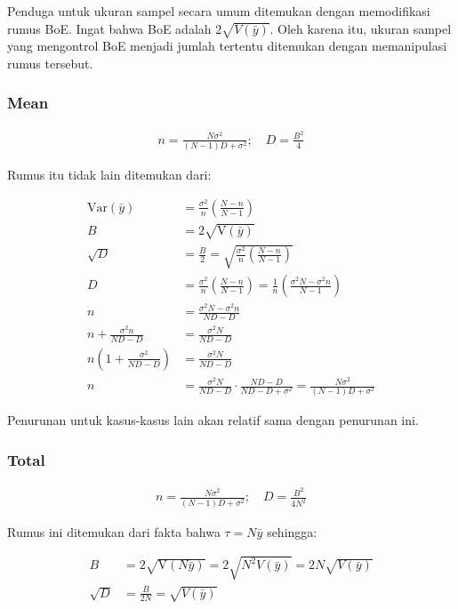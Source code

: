 \documentclass[
  letterpaper,
  DIV=11,
  numbers=noendperiod]{scrreprt}
\begin{document}
Penduga untuk ukuran sampel secara umum ditemukan dengan memodifikasi
rumus BoE. Ingat bahwa BoE adalah \(2\sqrt{V(\bar{y})}\). Oleh karena
itu, ukuran sampel yang mengontrol BoE menjadi jumlah tertentu ditemukan
dengan memanipulasi rumus tersebut.

\hypertarget{mean-2}{%
\subsubsection{Mean}\label{mean-2}}

\[
\begin{aligned}
n=\frac{N\sigma^2}{(N-1)D+\sigma^2}; \quad D=\frac{B^2}{4}
\end{aligned}
\]

Rumus itu tidak lain ditemukan dari:

\[
\begin{aligned}
\mathrm{Var}(\bar{y})&= \frac{\sigma^2}{n} \left( \frac{N-n}{N-1} \right)\\ 
B&=2\sqrt{\mathrm{V}(\bar{y})}\\ 
\sqrt{D}&=\frac{B}{2}=\sqrt{\frac{\sigma^2}{n} \left( \frac{N-n}{N-1} \right)}\\ 
D&=\frac{\sigma^2}{n} \left( \frac{N-n}{N-1} \right)=\frac{1}{n}\left(\frac{\sigma^2N-\sigma^2n}{N-1}\right)\\ 
n&=\frac{\sigma^2N-\sigma^2n}{ND-D}\\ 
n+\frac{\sigma^2n}{ND-D}&=\frac{\sigma^2N}{ND-D}\\ 
n\left(1+\frac{\sigma^2}{ND-D}\right)&=\frac{\sigma^2N}{ND-D}\\ 
n&=\frac{\sigma^2N}{ND-D}\cdot\frac{ND-D}{ND-D+\sigma^2}=\frac{N\sigma^2}{(N-1)D+\sigma^2}
\end{aligned}
\]

Penurunan untuk kasus-kasus lain akan relatif sama dengan penurunan ini.

\hypertarget{total-2}{%
\subsubsection{Total}\label{total-2}}

\[
\begin{aligned}
n=\frac{N\sigma^2}{(N-1)D+\sigma^2}; \quad D=\frac{B^2}{4N^2}
\end{aligned}
\]

Rumus ini ditemukan dari fakta bahwa \(\tau=N\bar{y}\) sehingga:

\[
\begin{aligned}
B&=2\sqrt{\mathrm{V}(N\bar{y})}=2\sqrt{N^2 V(\bar{y})}=2N\sqrt{V(\bar{y})}\\ 
\sqrt{D}&=\frac{B}{2N}=\sqrt{V(\bar{y})}\\ 
\end{aligned}
\]
\end{document}
